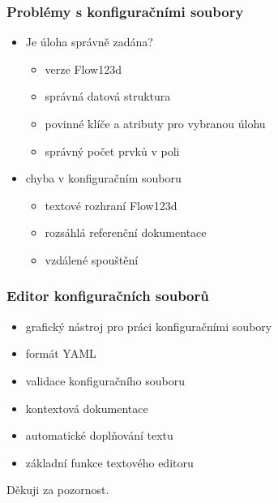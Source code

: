 \documentclass{beamer}
\begin{document}
\begin{frame}
	\frametitle{Problémy s konfiguračními soubory}
	\begin{itemize}
	\item<1-5> Je úloha správně zadána?
	\begin{itemize}
		\item<2,6-> verze Flow123d
		\item<3,6-> správná datová struktura
		\item<4,6-> povinné klíče a atributy pro vybranou úlohu
		\item<5,6-> správný počet prvků v poli
	\end{itemize}
	\item<6-9> chyba v konfiguračním souboru
		\begin{itemize}
			\item<-5,7> textové rozhraní Flow123d
			\item<-5,8> rozsáhlá referenční dokumentace
			\item<-5,9> vzdálené spouštění
		\end{itemize}
	\end{itemize}
\end{frame}

\begin{frame}
	\frametitle{Editor konfiguračních souborů}
	\begin{itemize}
		\item<1> grafický nástroj pro práci konfiguračními soubory
		\item<2> formát YAML
		\item<3> validace konfiguračního souboru
		\item<4> kontextová dokumentace
		\item<5> automatické doplňování textu
		\item<6> základní funkce textového editoru
	\end{itemize}
\end{frame}

\begin{frame}{}{}
\begin{center}
\huge Děkuji za pozornost.
\end{center}
\end{frame}
\end{document}
